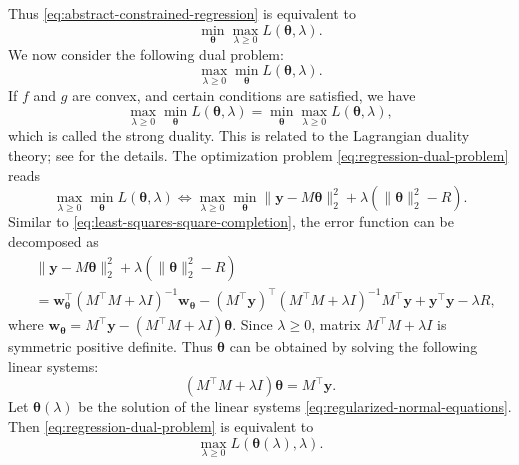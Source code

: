 {Thus \eqref{eq:abstract-constrained-regression} is equivalent to}
\[\min_{\boldsymbol{\theta}}\max_{\lambda\ge0}L(\boldsymbol{\theta},\lambda).\]
{We now consider the following dual problem:}
\begin{equation}\label{eq:regression-dual-problem}
\max_{\lambda\ge0}\min_{\boldsymbol{\theta}}L(\boldsymbol{\theta},\lambda).
\end{equation}
{If $f$ and $g$ are convex, and certain conditions are satisfied, we have}
\[\max_{\lambda\ge0}\min_{\boldsymbol{\theta}}L(\boldsymbol{\theta},\lambda)=\min_{\boldsymbol{\theta}}\max_{\lambda\ge0}L(\boldsymbol{\theta},\lambda),\]
{which is called the strong duality. This is related to the Lagrangian duality theory; see  for the details. The optimization problem \eqref{eq:regression-dual-problem} reads}
\begin{equation}\label{eq:regularized-regression-dual}
\max_{\lambda\ge0}\min_{\boldsymbol{\theta}}L(\boldsymbol{\theta},\lambda)\Leftrightarrow
\max_{\lambda\ge0}\min_{\boldsymbol{\theta}}\|\boldsymbol{y}-M\boldsymbol{\theta}\|_2^2+\lambda(\|\boldsymbol{\theta}\|_2^2-R).
\end{equation}
{Similar to \eqref{eq:least-squares-square-completion}, the error function can be decomposed as}
\[\begin{aligned}
&\|\boldsymbol{y}-M\boldsymbol{\theta}\|_2^2+\lambda(\|\boldsymbol{\theta}\|_2^2-R)\\
&=\boldsymbol{w}_{\boldsymbol{\theta}}^{\top}(M^{\top}M+\lambda I)^{-1}\boldsymbol{w}_{\boldsymbol{\theta}}-(M^{\top}\boldsymbol{y})^{\top}(M^{\top}M+\lambda I)^{-1}M^{\top}\boldsymbol{y}+\boldsymbol{y}^{\top}\boldsymbol{y}-\lambda R,
\end{aligned}\]
{where $\boldsymbol{w}_{\boldsymbol{\theta}}=M^{\top}\boldsymbol{y}-(M^{\top}M+\lambda I)\boldsymbol{\theta}$. Since $\lambda\ge0$, matrix $M^{\top}M+\lambda I$ is symmetric positive definite. Thus $\boldsymbol{\theta}$ can be obtained by solving the following linear systems:}
\begin{equation}\label{eq:regularized-normal-equations}
(M^{\top}M+\lambda I)\boldsymbol{\theta}=M^{\top}\boldsymbol{y}.
\end{equation}
{Let $\boldsymbol{\theta}(\lambda)$ be the solution of the linear systems \eqref{eq:regularized-normal-equations}. Then \eqref{eq:regression-dual-problem} is equivalent to}
\[\max_{\lambda\ge0}L(\boldsymbol{\theta}(\lambda),\lambda).\]
